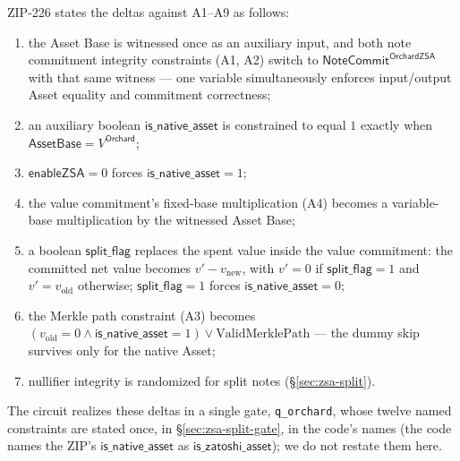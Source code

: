 \documentclass[11pt,a4paper]{article}
\theoremstyle{definition}
\newcommand{\NoteCommit}{\ensuremath{\mathsf{NoteCommit}}}
\begin{document}
ZIP-226 states the deltas against A1--A9 as follows:
\begin{enumerate}[label=(\alph*), leftmargin=*]
\item the Asset Base is witnessed once as an auxiliary input, and both note
commitment integrity constraints (A1, A2) switch to
$\NoteCommit^{\mathsf{OrchardZSA}}$ with that same witness --- one variable
simultaneously enforces input/output Asset equality and commitment
correctness;
\item an auxiliary boolean $\mathsf{is\_native\_asset}$ is constrained to
equal $1$ exactly when $\mathsf{AssetBase} = V^{\mathsf{Orchard}}$;
\item $\mathsf{enableZSA} = 0$ forces $\mathsf{is\_native\_asset} = 1$;
\item the value commitment's fixed-base multiplication (A4) becomes a
variable-base multiplication by the witnessed Asset Base;
\item a boolean $\mathsf{split\_flag}$ replaces the spent value inside
the value commitment: the committed net value becomes
$v' - v_{\mathrm{new}}$, with $v' = 0$ if $\mathsf{split\_flag} = 1$ and
$v' = v_{\mathrm{old}}$ otherwise; $\mathsf{split\_flag} = 1$ forces
$\mathsf{is\_native\_asset} = 0$;
\item the Merkle path constraint (A3) becomes
$(v_{\mathrm{old}} = 0 \wedge \mathsf{is\_native\_asset} = 1) \vee
\mathrm{ValidMerklePath}$ --- the dummy skip survives only for the native
Asset;
\item nullifier integrity is randomized for split notes
(\S\ref{sec:zsa-split}).
\end{enumerate}

The circuit realizes these deltas in a single gate, \texttt{q\_orchard},
whose twelve named constraints are stated once, in
\S\ref{sec:zsa-split-gate}, in the code's names (the code names the ZIP's
$\mathsf{is\_native\_asset}$ as $\mathsf{is\_zatoshi\_asset}$); we do not
restate them here.
\end{document}
